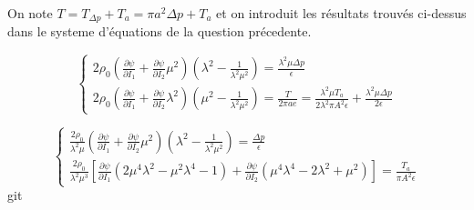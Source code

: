 \documentclass[a4paper,11pt]{article}
\begin{document}
On note $T = T_{\Delta p} + T_a = \pi a^2 \Delta p + T_a$ et on introduit les résultats trouvés ci-dessus dans le systeme d'équations de la question précedente.

$$
\begin{cases}
2\rho_0 \left (\frac{\partial\psi}{\partial I_1} + \frac{\partial\psi}{\partial I_2} \mu^2 \right) \left ( \lambda^2 - \frac{1}{\lambda^2\mu^2} \right) = \frac{\lambda^2\mu \Delta p}{\epsilon} \\
2\rho_0 \left (\frac{\partial\psi}{\partial I_1} + \frac{\partial\psi}{\partial I_2} \lambda^2 \right) \left ( \mu^2 - \frac{1}{\lambda^2\mu^2} \right) = \frac{T}{2\pi ae} = \frac{\lambda^2\mu T_a}{2\lambda^2\pi A^2 \epsilon } + \frac{\lambda^2\mu\Delta p}{2\epsilon}
\end{cases}
$$

$$
\begin{cases}
\frac{2\rho_0}{\lambda^2\mu} \left (\frac{\partial\psi}{\partial I_1} + \frac{\partial\psi}{\partial I_2} \mu^2 \right) \left ( \lambda^2 - \frac{1}{\lambda^2\mu^2} \right) = \frac{\Delta p}{\epsilon} \\
\frac{2\rho_0}{\lambda^2\mu^3} \left [\frac{\partial\psi}{\partial I_1} (2\mu^4\lambda^2-\mu^2\lambda^4-1) + \frac{\partial\psi}{\partial I_2} (\mu^4 \lambda^4 - 2\lambda^2 + \mu^2) \right] = \frac{T_a}{\pi A^2 \epsilon}
\end{cases}
$$git
\end{document}
